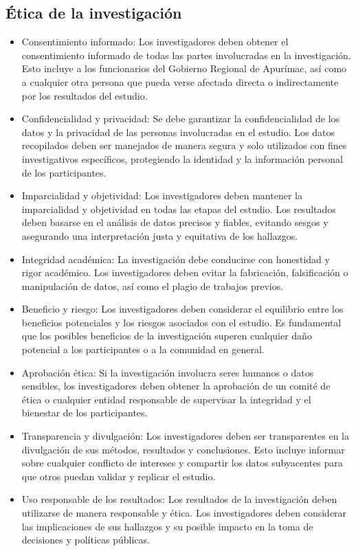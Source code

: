 \subsection{Ética de la investigación}
\begin{itemize}
	\item Consentimiento informado: Los investigadores deben obtener el consentimiento informado de todas las partes involucradas en la investigación. Esto incluye a los funcionarios del Gobierno Regional de Apurímac, así como a cualquier otra persona que pueda verse afectada directa o indirectamente por los resultados del estudio.
	\item Confidencialidad y privacidad: Se debe garantizar la confidencialidad de los datos y la privacidad de las personas involucradas en el estudio. Los datos recopilados deben ser manejados de manera segura y solo utilizados con fines investigativos específicos, protegiendo la identidad y la información personal de los participantes.
	\item Imparcialidad y objetividad: Los investigadores deben mantener la imparcialidad y objetividad en todas las etapas del estudio. Los resultados deben basarse en el análisis de datos precisos y fiables, evitando sesgos y asegurando una interpretación justa y equitativa de los hallazgos.
	\item Integridad académica: La investigación debe conducirse con honestidad y rigor académico. Los investigadores deben evitar la fabricación, falsificación o manipulación de datos, así como el plagio de trabajos previos.
	\item Beneficio y riesgo: Los investigadores deben considerar el equilibrio entre los beneficios potenciales y los riesgos asociados con el estudio. Es fundamental que los posibles beneficios de la investigación superen cualquier daño potencial a los participantes o a la comunidad en general.

	\item Aprobación ética: Si la investigación involucra seres humanos o datos sensibles, los investigadores deben obtener la aprobación de un comité de ética o cualquier entidad responsable de supervisar la integridad y el bienestar de los participantes.

	\item Transparencia y divulgación: Los investigadores deben ser transparentes en la divulgación de sus métodos, resultados y conclusiones. Esto incluye informar sobre cualquier conflicto de intereses y compartir los datos subyacentes para que otros puedan validar y replicar el estudio.
	\item Uso responsable de los resultados: Los resultados de la investigación deben utilizarse de manera responsable y ética. Los investigadores deben considerar las implicaciones de sus hallazgos y su posible impacto en la toma de decisiones y políticas públicas.


\end{itemize}
